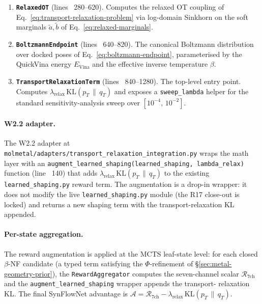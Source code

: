 \begin{enumerate}
  \item \textbf{\texttt{RelaxedOT}} (lines ~280--620).  Computes the
        relaxed OT coupling of Eq.~\eqref{eq:transport-relaxation-problem}
        via log-domain Sinkhorn on the soft marginals
        $\tilde{a}, \tilde{b}$ of Eq.~\eqref{eq:relaxed-marginals}.

  \item \textbf{\texttt{BoltzmannEndpoint}} (lines ~640--820).  The
        canonical Boltzmann distribution over docked poses of
        Eq.~\eqref{eq:boltzmann-endpoint}, parameterised by the
        QuickVina energy $E_{\mathrm{Vina}}$ and the effective
        inverse temperature $\beta$.

  \item \textbf{\texttt{TransportRelaxationTerm}} (lines ~840--1280).
        The top-level entry point.  Computes
        $\lambda_{\mathrm{relax}}\, \mathrm{KL}(p_{T} \,\|\, q_{T})$
        and exposes a \texttt{sweep\_lambda} helper for the standard
        sensitivity-analysis sweep over
        $[10^{-4},\,10^{-2}]$.
\end{enumerate}

\paragraph{W2.2 adapter.}
The W2.2 adapter at
\texttt{molmetal/adapters/transport\_relaxation\_integration.py}
wraps the math layer with an
\texttt{augment\_learned\_shaping(learned\_shaping, lambda\_relax)}
function (line ~140) that adds
$\lambda_{\mathrm{relax}}\, \mathrm{KL}(p_{T} \,\|\, q_{T})$ to the
existing \texttt{learned\_shaping.py} reward term.  The augmentation
is a drop-in wrapper: it does not modify the live
\texttt{learned\_shaping.py} module (the R17 close-out is locked)
and returns a new shaping term with the transport-relaxation KL
appended.

\paragraph{Per-state aggregation.}
The reward augmentation is applied at the MCTS leaf-state level: for
each closed $\beta$-NF candidate (a typed term satisfying the
$\Phi$-refinement of \S\ref{sec:metal-geometry-prior}), the
\texttt{RewardAggregator} computes the seven-channel scalar
$\mathcal{R}_{\mathrm{7ch}}$ and the
\texttt{augment\_learned\_shaping} wrapper appends the transport-
relaxation KL.  The final SynFlowNet advantage is
$\mathcal{A} = \mathcal{R}_{\mathrm{7ch}} - \lambda_{\mathrm{relax}}\,
\mathrm{KL}(p_{T} \,\|\, q_{T})$.

